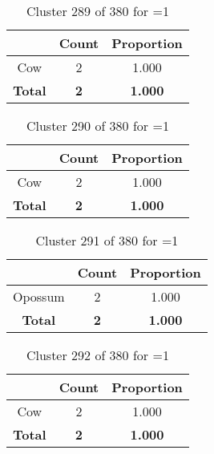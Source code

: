 \begin{table}[ht!]
\centering
\begin{tabular}{|c|c|c|}
\hline
\bf \Spec{} &\bf Count &\bf Proportion\\ \hline \hline
Cow & 2 & 1.000\\ \hline
\hline
\bf Total & \bf 2 & \bf 1.000\\ \hline
\end{tabular}
\label{tab:cluster:289:1}
\caption{Cluster 289 of 380 for \minneigh{}=1}
\end{table}

\clearpage
\begin{table}[ht!]
\centering
\begin{tabular}{|c|c|c|}
\hline
\bf \Spec{} &\bf Count &\bf Proportion\\ \hline \hline
Cow & 2 & 1.000\\ \hline
\hline
\bf Total & \bf 2 & \bf 1.000\\ \hline
\end{tabular}
\label{tab:cluster:290:1}
\caption{Cluster 290 of 380 for \minneigh{}=1}
\end{table}

\begin{table}[ht!]
\centering
\begin{tabular}{|c|c|c|}
\hline
\bf \Spec{} &\bf Count &\bf Proportion\\ \hline \hline
Opossum & 2 & 1.000\\ \hline
\hline
\bf Total & \bf 2 & \bf 1.000\\ \hline
\end{tabular}
\label{tab:cluster:291:1}
\caption{Cluster 291 of 380 for \minneigh{}=1}
\end{table}

\begin{table}[ht!]
\centering
\begin{tabular}{|c|c|c|}
\hline
\bf \Spec{} &\bf Count &\bf Proportion\\ \hline \hline
Cow & 2 & 1.000\\ \hline
\hline
\bf Total & \bf 2 & \bf 1.000\\ \hline
\end{tabular}
\label{tab:cluster:292:1}
\caption{Cluster 292 of 380 for \minneigh{}=1}
\end{table}

